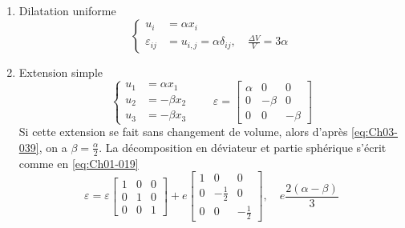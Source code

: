 \begin{enumerate}
    \item Dilatation uniforme
        \begin{equation}
            \left\{
            \begin{aligned}
                u_i &= \alpha x_i \\
                \varepsilon_{ij} &= u_{i,j} = \alpha \delta_{ij}, \quad \frac{\Delta V}{V} = 3\alpha
            \end{aligned}
            \right.
            \label{eq:Ch03-041}
        \end{equation}
    \item Extension simple
        \begin{equation}
            \left\{
            \begin{aligned}
                u_1 &= \alpha x_1 \\
                u_2 &= -\beta x_2 \\
                u_3 &= -\beta x_3
            \end{aligned}
            \right. \qquad
            \mathbb{\varepsilon} = 
            \begin{bmatrix}
                \alpha & 0 & 0 \\
                0 & -\beta & 0 \\
                0 & 0 & -\beta
            \end{bmatrix}
            \label{eq:Ch03-042}
        \end{equation}
        Si cette extension se fait sans changement de volume, alors d'après \eqref{eq:Ch03-039}, on a $\beta = \frac{\alpha}{2}$.
        La décomposition en déviateur et partie sphérique s'écrit comme en \eqref{eq:Ch01-019}
        \begin{equation}
            \mathbb{\varepsilon} = \varepsilon 
            \begin{bmatrix}
                1 & 0 & 0 \\
                0 & 1 & 0 \\
                0 & 0 & 1
            \end{bmatrix}
            + e 
            \begin{bmatrix}
                1 & 0 & 0 \\
                0 & -\frac{1}{2} & 0 \\
                0 & 0 & -\frac{1}{2}
            \end{bmatrix}
            , \quad e \frac{2 \left( \alpha - \beta \right)}{3}

\end{equation}
\end{enumerate}
